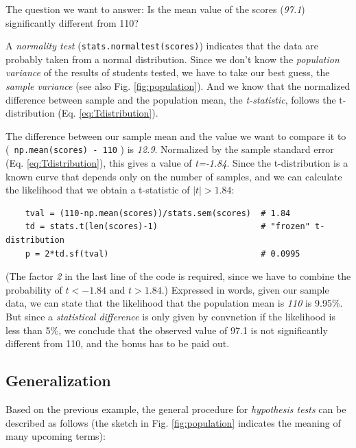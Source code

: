 The question we want to answer: Is the mean value of the scores (\emph{97.1}) significantly different from 110?

A \emph{normality test} (\lstinline{stats.normaltest(scores)}) indicates that the data are probably taken from a normal distribution.  Since we don't know the \emph{population variance} of the results of students tested, we have to take our best guess, the \emph{sample variance} (see also Fig. \ref{fig:population}). And we know that the normalized difference between sample and the population mean, the \emph{t-statistic}, follows the t-distribution (Eq. \ref{eq:Tdistribution}).

The difference between our sample mean and the value we want to compare it to (\lstinline{ np.mean(scores) - 110} ) is \emph{12.9}. Normalized by the sample standard error (Eq. \ref{eq:Tdistribution}), this gives a value of \emph{t=-1.84}. Since the t-distribution is a known curve that depends only on the number of samples, and we can calculate the likelihood that we obtain a t-statistic of $|t| > 1.84$:

\begin{lstlisting}
    tval = (110-np.mean(scores))/stats.sem(scores)  # 1.84
    td = stats.t(len(scores)-1)                     # "frozen" t-distribution
    p = 2*td.sf(tval)                               # 0.0995
\end{lstlisting}

(The factor \emph{2} in the last line of the code is required, since we have to combine the probability of $t<-1.84$ and $t>1.84$.) Expressed in words, given our sample data, we can state that the likelihood that the population mean is \emph{110} is 9.95\%. But since a \emph{statistical difference} is only given by convnetion if the likelihood is less than 5\%, we conclude that the observed value of 97.1 is not significantly different from 110, and the bonus has to be paid out.

\subsection{Generalization}

Based on the previous example, the general procedure for \emph{hypothesis tests} can be described as follows (the sketch in Fig. \ref{fig:population} indicates the meaning of many upcoming terms):

